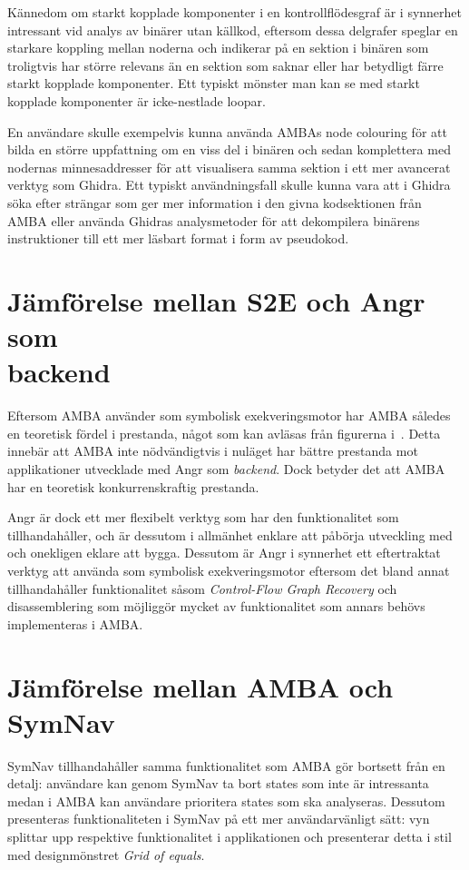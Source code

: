 Kännedom om starkt kopplade komponenter i en kontrollflödesgraf är i synnerhet
intressant vid analys av binärer utan källkod, eftersom dessa delgrafer speglar
en starkare koppling mellan noderna och indikerar på en sektion i binären som
troligtvis har större relevans än en sektion som saknar eller har betydligt
färre starkt kopplade komponenter. Ett typiskt mönster man kan se med starkt
kopplade komponenter är icke-nestlade loopar.

En användare skulle exempelvis kunna använda AMBAs node colouring för att bilda
en större uppfattning om en viss del i binären och sedan komplettera med
nodernas minnesaddresser för att visualisera samma sektion i ett mer avancerat
verktyg som Ghidra. Ett typiskt användningsfall skulle kunna vara att i Ghidra
söka efter strängar som ger mer information i den givna kodsektionen från AMBA
eller använda Ghidras analysmetoder för att dekompilera binärens instruktioner
till ett mer läsbart format i form av pseudokod.

\section{Jämförelse mellan S2E och Angr som \\ backend} Eftersom AMBA använder
\stoe{} som symbolisk exekveringsmotor har AMBA således en teoretisk fördel i
prestanda, något som kan avläsas från figurerna
i~\cite[Figur~1-5]{systematic_comparison_symbex}. Detta innebär att AMBA inte nödvändigtvis i
nuläget har bättre prestanda mot applikationer utvecklade med Angr som
\emph{backend}. Dock betyder det att AMBA har en teoretisk konkurrenskraftig
prestanda.

Angr är dock ett mer flexibelt verktyg som har den funktionalitet som \stoe{}
tillhandahåller, och är dessutom i allmänhet enklare att påbörja utveckling med
och onekligen eklare att bygga. Dessutom är Angr i synnerhet ett eftertraktat
verktyg att använda som symbolisk exekveringsmotor eftersom det bland annat
tillhandahåller funktionalitet såsom \emph{Control-Flow Graph Recovery} och
disassemblering som möjliggör mycket av funktionalitet som annars behövs
implementeras i AMBA.

\section{Jämförelse mellan AMBA och SymNav} SymNav tillhandahåller samma
funktionalitet som AMBA gör bortsett från en detalj: användare kan genom SymNav
ta bort states som inte är intressanta medan i AMBA kan användare prioritera
states som ska analyseras. Dessutom presenteras funktionaliteten i SymNav på ett
mer användarvänligt sätt: vyn splittar upp respektive funktionalitet i
applikationen och presenterar detta i stil med designmönstret \emph{Grid of
    equals}.

